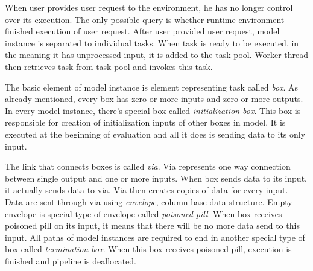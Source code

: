 When user provides user request to the environment, he has no longer control over its execution. The only possible query is whether runtime environment finished execution of user request. After user provided user request, model instance is separated to individual tasks. When task is ready to be executed, in the meaning it has unprocessed input, it is added to the task pool. Worker thread then retrieves task from task pool and invokes this task.

The basic element of model instance is element representing task called \textit{box}.  As already mentioned, every box has zero or more inputs and zero or more outputs. In every model instance, there's special box called \textit{initialization box}. This box is responsible for creation of initialization inputs of other boxes in model. It is executed at the beginning of evaluation and all it does is sending data to its only input.

The link that connects boxes is called \textit{via}. Via represents one way connection between single output and one or more inputs. When box sends data to its input, it actually sends data to via. Via then creates copies of data for every input. Data are sent through via using \textit{envelope}, column base data structure. Empty envelope is special type of envelope called \textit{poisoned pill}. When box receives poisoned pill on its input, it means that there will be no more data send to this input. All paths of model instances are required to end in another special type of box called \textit{termination box}. When this box receives poisoned pill, execution is finished and pipeline is deallocated.

